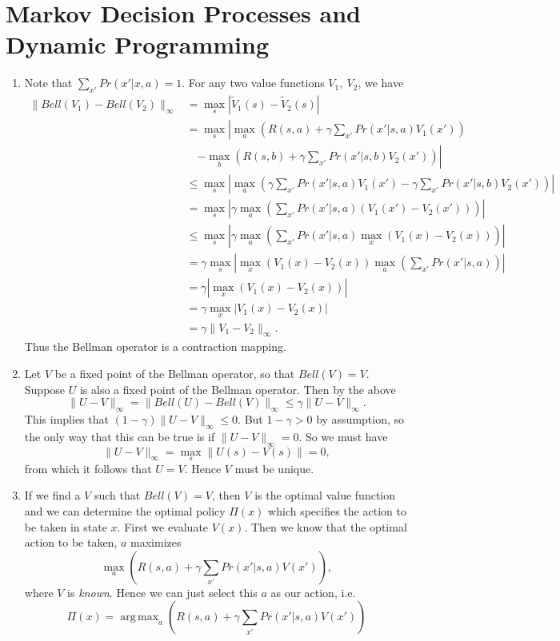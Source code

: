 \documentclass{article}
\DeclareMathOperator*{\argmax}{arg\,max}
\begin{document}
\section{Markov Decision Processes and Dynamic Programming}
\begin{enumerate}
    \item Note that $\sum_{x'}Pr(x'|x,a) = 1$.
    For any two value functions $V_1,~V_2$, we have
    \begin{align*}
        \|Bell(V_1)-Bell(V_2)\|_{\infty} &= \max_s\left|\tilde V_1(s)-\tilde V_2(s)\right|\\
        &= \max_s\left|\max_a\left(R(s,a) +\gamma\sum_{x'}Pr(x'|s,a)V_1(x')\right)\right.\\&\quad\left.-\max_b\left(R(s,b) +\gamma\sum_{x'}Pr(x'|s,b)V_2(x')\right) \right| \\
        &\leq \max_s\left| \max_a\left(\gamma\sum_{x'}Pr(x'|s,a)V_1(x')-\gamma\sum_{x'}Pr(x'|s,b)V_2(x')\right)\right|\\
        &= \max_s\left|\gamma\max_a\left(\sum_{x'}Pr(x'|s,a)\left(V_1(x')-V_2(x')\right)\right)\right|\\
        &\leq \max_s\left|\gamma\max_a\left( \sum_{x'}Pr(x'|s,a)\max_{x}(V_1(x)-V_2(x))\right) \right|\\
        &= \gamma \max_s\left|\max_x(V_1(x)-V_2(x)) \max_a\left(\sum_{x'}Pr(x'|s,a)\right) \right|\\
        &= \gamma \left|\max_x(V_1(x)-V_2(x)) \right| \\
        &=\gamma \max_x\left|V_1(x)-V_2(x)\right|\\
        &= \gamma \|V_1-V_2\|_{\infty}.
    \end{align*}
    Thus the Bellman operator is a contraction mapping.
    \item Let $V$ be a fixed point of the Bellman operator, so that $Bell(V)=V$. Suppose $U$ is also a fixed point of the Bellman operator. Then by the above
    \[
        \|U-V\|_{\infty} = \|Bell(U)-Bell(V)\|_{\infty}\leq \gamma \|U-V\|_{\infty}.
    \]
    This implies that $(1-\gamma)\|U-V\|_{\infty}\leq0$. But $1-\gamma>0$ by assumption, so the only way that this can be true is if $\|U-V\|_{\infty}=0$. So we must have
    \[
        \|U-V\|_{\infty}=\max_s\|U(s)-V(s)\|=0,
    \]
    from which it follows that $U=V$. Hence $V$ must be unique.
    \item If we find a $V$ such that $Bell(V)=V$, then $V$ is the optimal value function and we can determine the optimal policy $\Pi(x)$ which specifies the action to be taken in state $x$. First we evaluate $V(x)$. Then we know that the optimal action to be taken, $a$ maximizes
    \[
        \max_a\left(R(s,a) +\gamma\sum_{x'}Pr(x'|s,a)V(x')\right),
    \]
    where $V$ is \textit{known}. Hence we can just select this $a$ as our action, i.e.
    \[
        \Pi(x) = \argmax_a\left(R(s,a) +\gamma\sum_{x'}Pr(x'|s,a)V(x')\right)
    \]
\end{enumerate}
\end{document}
